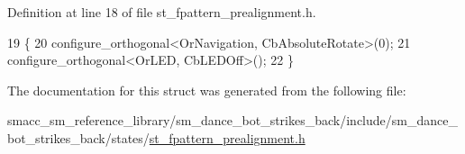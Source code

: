 Definition at line 18 of file st\+\_\+fpattern\+\_\+prealignment.\+h.


\begin{DoxyCode}
19   \{
20     configure\_orthogonal<OrNavigation, CbAbsoluteRotate>(0);
21     configure\_orthogonal<OrLED, CbLEDOff>();
22   \}
\end{DoxyCode}


The documentation for this struct was generated from the following file\+:\begin{DoxyCompactItemize}
\item 
smacc\+\_\+sm\+\_\+reference\+\_\+library/sm\+\_\+dance\+\_\+bot\+\_\+strikes\+\_\+back/include/sm\+\_\+dance\+\_\+bot\+\_\+strikes\+\_\+back/states/\hyperlink{st__fpattern__prealignment_8h}{st\+\_\+fpattern\+\_\+prealignment.\+h}\end{DoxyCompactItemize}
